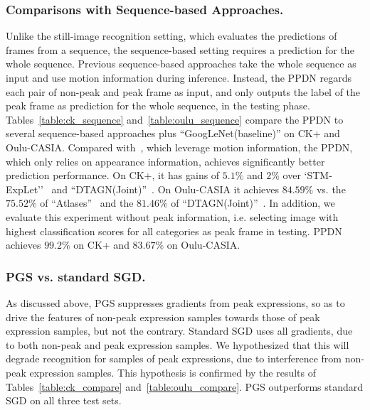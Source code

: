 \documentclass[runningheads]{llncs}
\begin{document}
\subsubsection{Comparisons with Sequence-based Approaches.} Unlike the 
still-image recognition setting, which evaluates the predictions of frames 
from a sequence, the sequence-based setting requires a prediction for the
whole sequence. Previous sequence-based approaches take the whole sequence 
as input and use motion information during inference. Instead, the PPDN 
regards each pair of non-peak and peak frame as input, and only outputs
the label of the peak frame as prediction for the whole sequence, in the 
testing phase. Tables~\ref{table:ck_sequence} and~\ref{table:oulu_sequence} compare
the PPDN to several sequence-based approaches plus ``GoogLeNet(baseline)'' 
on CK+ and Oulu-CASIA. Compared with~\cite{liu2014learning,liu2014deeply,jung2015joint}, which leverage motion information, the PPDN, which only relies on  
appearance information, achieves significantly better prediction performance.
On CK+, it has gains of $5.1\%$ and $2\%$ over 
`STM-ExpLet''~\cite{liu2014learning} and 
``DTAGN(Joint)''~\cite{jung2015joint}. On Oulu-CASIA it achieves
$84.59\%$ vs. the $75.52\%$ of ``Atlases''~\cite{guo2012dynamic} and 
the $81.46\%$ of ``DTAGN(Joint)''~\cite{jung2015joint}. In addition, we evaluate this experiment without peak information, i.e. selecting image with highest classification scores for all categories as peak frame in testing. PPDN achieves $99.2\%$ on CK+ and $83.67\%$ on Oulu-CASIA.

\subsubsection{PGS vs. standard SGD.} As discussed above, PGS suppresses gradients
from peak expressions, so as to drive the features of non-peak 
expression samples towards those of peak expression samples, but not the
contrary. Standard SGD uses all gradients, due to both non-peak and peak 
expression samples. We hypothesized that this will degrade recognition 
for samples of peak expressions, due to interference from non-peak 
expression samples. This hypothesis is confirmed by the results
of Tables~\ref{table:ck_compare} and~\ref{table:oulu_compare}. 
PGS outperforms standard SGD on all three test sets.
\end{document}
